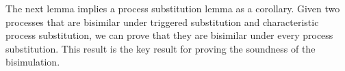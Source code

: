 \begin{comment}
				\noi The freshness of $t$ implies that
				\[
					\mhorel{\Gamma}{\Delta_1'}{\newsp{\widetilde{m_1}}{P' \Par \fotrigger{t}{x}{s}{\btinp{U} \tinact}{V_1}}}
					{\hby{\bactinp{t}{m'}}}
					{\Delta_1''}{}{\newsp{\widetilde{m_1}}{P' \Par \newsp{s}{\map{\btinp{U} \tinact}^{s} \Par \bout{\dual{s}}{V_1} \inact}}}
				\]
				\noi and
				\[
					\mhorel{\Gamma}{\Delta_2'}{\newsp{\widetilde{m_2}}{Q' \Par \fotrigger{t}{x}{s}{\btinp{U} \tinact}{V_2}}}
					{\hby{\bactinp{t}{m'}}}
					{\Delta_2''}{}{\newsp{\widetilde{m_2}}{Q' \Par \newsp{s}{\map{\btinp{U} \tinact}^{s} \Par \bout{\dual{s}}{V_2} \inact}}}
				\]
				\noi	thus processes in \eqref{lem:wb_eq_wbf3} are higher order bisimilar and
						thus they are included in $\Re$.
		

		\item	The other cases are trivial.
	\end{enumerate}

	\noi The direction $\fwb \subseteq \hwb$ is very similar to the
	direction $\hwb \subseteq \fwb$: it requires a case analysis
	on the transition label $\ell$. Again, the non-trivial case is
	$\ell = \news{\widetilde{m_1}} \bactout{n}{V_1}$.
	\qed
\end{proof}
\end{comment}



The next lemma implies a process substitution lemma as a corollary.
Given two processes that are bisimilar under triggered substitution
and characteristic process substitution, we can prove that they are
bisimilar under every process substitution. This result is
the key result for proving the soundness of the bisimulation. 

%
%
%


